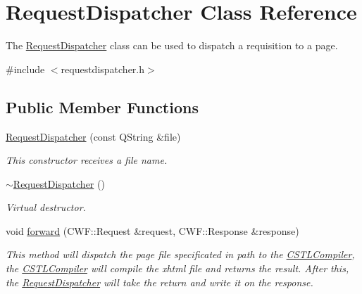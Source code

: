 \hypertarget{class_request_dispatcher}{}\section{Request\+Dispatcher Class Reference}
\label{class_request_dispatcher}


The \hyperlink{class_request_dispatcher}{Request\+Dispatcher} class can be used to dispatch a requisition to a page.  




{\ttfamily \#include $<$requestdispatcher.\+h$>$}

\subsection*{Public Member Functions}
\begin{DoxyCompactItemize}
\item 
\mbox{\label{class_request_dispatcher_a3251b6940f8b27a889b52617853338a0}} 
\hyperlink{class_request_dispatcher_a3251b6940f8b27a889b52617853338a0}{Request\+Dispatcher} (const Q\+String \&file)
\begin{DoxyCompactList}\small\item\em This constructor receives a file name. \end{DoxyCompactList}\item 
\mbox{\label{class_request_dispatcher_a1b09805ab31a0f96d9823a2bf9de3771}} 
\hyperlink{class_request_dispatcher_a1b09805ab31a0f96d9823a2bf9de3771}{$\sim$\+Request\+Dispatcher} ()
\begin{DoxyCompactList}\small\item\em Virtual destructor. \end{DoxyCompactList}\item 
void \hyperlink{class_request_dispatcher_a6416fc9441670d1de84b3c8262d13220}{forward} (C\+W\+F\+::\+Request \&request, C\+W\+F\+::\+Response \&response)
\begin{DoxyCompactList}\small\item\em This method will dispatch the page file specificated in path to the \hyperlink{class_c_s_t_l_compiler}{C\+S\+T\+L\+Compiler}, the \hyperlink{class_c_s_t_l_compiler}{C\+S\+T\+L\+Compiler} will compile the xhtml file and returns the result. After this, the \hyperlink{class_request_dispatcher}{Request\+Dispatcher} will take the return and write it on the response. \end{DoxyCompactList}\end{DoxyCompactItemize}


